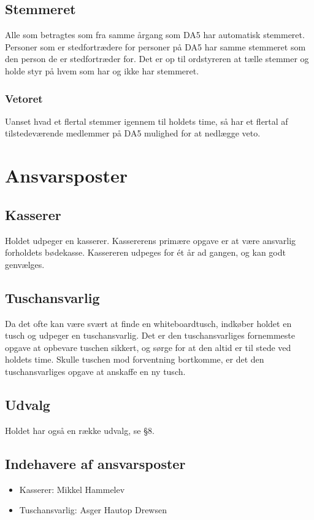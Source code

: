 \documentclass{article}
\let\OldS\S
\renewcommand{\S}{\OldS{}}
\begin{document}
	\subsection{Stemmeret}
	Alle som betragtes som fra samme årgang som DA5 har automatisk stemmeret. Personer som er stedfortrædere for personer på DA5 har samme stemmeret som den person de er stedfortræder for. Det er op til ordstyreren at tælle stemmer og holde styr på hvem som har og ikke har stemmeret.
	\subsubsection{Vetoret}
	Uanset hvad et flertal stemmer igennem til holdets time, så har et flertal af tilstedeværende medlemmer på DA5 mulighed for at nedlægge veto.
	
	\section{Ansvarsposter}
	\subsection{Kasserer}
	Holdet udpeger en kasserer. Kassererens primære opgave er at være ansvarlig forholdets bødekasse. Kassereren udpeges for ét år ad gangen, og kan godt genvælges.
	\subsection{Tuschansvarlig}
	Da det ofte kan være svært at finde en whiteboardtusch, indkøber holdet en tusch og udpeger en tuschansvarlig. Det er den tuschansvarliges fornemmeste opgave at opbevare tuschen sikkert, og sørge for at den altid er til stede ved holdets time. Skulle 
	tuschen mod forventning bortkomme, er det den tuschansvarliges opgave at anskaffe en 
	ny tusch.
	\subsection{Udvalg}
	Holdet har også en række udvalg, se \S8.
	\subsection{Indehavere af ansvarsposter}
	\begin{itemize}
		\item Kasserer: Mikkel Hammelev
		\item Tuschansvarlig: Asger Hautop Drewsen
	\end{itemize}
	
\end{document}
